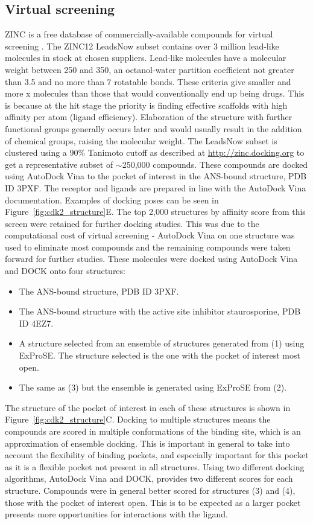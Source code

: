 \subsection{Virtual screening}

ZINC is a free database of commercially-available compounds for virtual screening \cite{Sterling2015}.
The ZINC12 LeadsNow subset contains over 3 million lead-like molecules in stock at chosen suppliers.
Lead-like molecules have a molecular weight between 250 and 350, an octanol-water partition coefficient not greater than 3.5 and no more than 7 rotatable bonds.
These criteria give smaller and more x molecules than those that would conventionally end up being drugs.
This is because at the hit stage the priority is finding effective scaffolds with high affinity per atom (ligand efficiency).
Elaboration of the structure with further functional groups generally occurs later and would usually result in the addition of chemical groups, raising the molecular weight.
The LeadsNow subset is clustered using a 90\% Tanimoto cutoff as described at \url{http://zinc.docking.org} to get a representative subset of $\sim$250,000 compounds.
These compounds are docked using AutoDock Vina \cite{Trott2010} to the pocket of interest in the ANS-bound structure, PDB ID 3PXF.
The receptor and ligands are prepared in line with the AutoDock Vina documentation.
Examples of docking poses can be seen in Figure~\ref{fig:cdk2_structure}E.
The top 2,000 structures by affinity score from this screen were retained for further docking studies.
This was due to the computational cost of virtual screening - AutoDock Vina on one structure was used to eliminate most compounds and the remaining compounds were taken forward for further studies.
These molecules were docked using AutoDock Vina and DOCK \cite{Allen2015} onto four structures:
\begin{itemize}
\item The ANS-bound structure, PDB ID 3PXF.
\item The ANS-bound structure with the active site inhibitor staurosporine, PDB ID 4EZ7.
\item A structure selected from an ensemble of structures generated from (1) using ExProSE.
The structure selected is the one with the pocket of interest most open.
\item The same as (3) but the ensemble is generated using ExProSE from (2).
\end{itemize}
The structure of the pocket of interest in each of these structures is shown in Figure~\ref{fig:cdk2_structure}C.
Docking to multiple structures means the compounds are scored in multiple conformations of the binding site, which is an approximation of ensemble docking.
This is important in general to take into account the flexibility of binding pockets, and especially important for this pocket as it is a flexible pocket not present in all structures.
Using two different docking algorithms, AutoDock Vina and DOCK, provides two different scores for each structure.
Compounds were in general better scored for structures (3) and (4), those with the pocket of interest open.
This is to be expected as a larger pocket presents more opportunities for interactions with the ligand.



